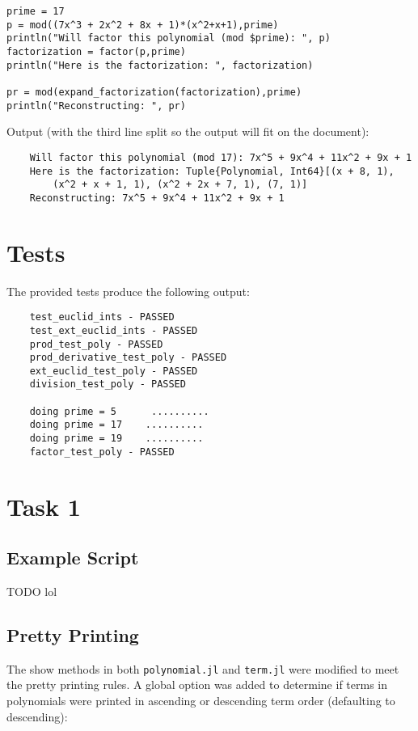 \documentclass{article}
\theoremstyle{plain}
\numberwithin{theorem}{section}
\numberwithin{example}{section}
\theoremstyle{definition}
\numberwithin{definition}{section}
\begin{document}
\begin{codebox}
    \begin{Verbatim}
prime = 17
p = mod((7x^3 + 2x^2 + 8x + 1)*(x^2+x+1),prime)
println("Will factor this polynomial (mod $prime): ", p)
factorization = factor(p,prime)
println("Here is the factorization: ", factorization)

pr = mod(expand_factorization(factorization),prime)
println("Reconstructing: ", pr)
    \end{Verbatim}
\end{codebox}

Output (with the third line split so the output will fit on the document):
\begin{Verbatim}
    Will factor this polynomial (mod 17): 7x^5 + 9x^4 + 11x^2 + 9x + 1
    Here is the factorization: Tuple{Polynomial, Int64}[(x + 8, 1),
        (x^2 + x + 1, 1), (x^2 + 2x + 7, 1), (7, 1)]
    Reconstructing: 7x^5 + 9x^4 + 11x^2 + 9x + 1
\end{Verbatim}

\bigbreak

\section{Tests}
The provided tests produce the following output:
\begin{Verbatim}
    test_euclid_ints - PASSED
    test_ext_euclid_ints - PASSED
    prod_test_poly - PASSED
    prod_derivative_test_poly - PASSED
    ext_euclid_test_poly - PASSED
    division_test_poly - PASSED

    doing prime = 5 	 ..........
    doing prime = 17 	..........
    doing prime = 19 	..........
    factor_test_poly - PASSED
\end{Verbatim}

\bigbreak

\section{Task 1}
\subsection{Example Script}
TODO lol

\bigbreak

\subsection{Pretty Printing}
The show methods in both \texttt{polynomial.jl} and \texttt{term.jl} were
modified to meet the pretty printing rules. A global option was added to
determine if terms in polynomials were printed in ascending or descending term
order (defaulting to descending):
\end{document}
